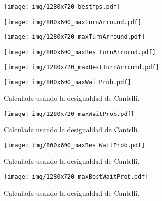 \begin{figure}[h]

	\texttt{[image: img/1280x720\_bestfps.pdf]}
	\caption{}

\end{figure}

\begin{figure}[h]

	\texttt{[image: img/800x600\_maxTurnArround.pdf]}
	\caption{}

\end{figure}

\begin{figure}[h]

	\texttt{[image: img/1280x720\_maxTurnArround.pdf]}
	\caption{}

\end{figure}

\begin{figure}[h]

	\texttt{[image: img/800x600\_maxBestTurnArround.pdf]}
	\caption{}

\end{figure}

\begin{figure}[h]

	\texttt{[image: img/1280x720\_maxBestTurnArround.pdf]}
	\caption{}

\end{figure}

\begin{figure}[h]

	\texttt{[image: img/800x600\_maxWaitProb.pdf]}
	\caption{Calculado usando la desigualdad de Cantelli.}

\end{figure}

\begin{figure}[h]

	\texttt{[image: img/1280x720\_maxWaitProb.pdf]}
	\caption{Calculado usando la desigualdad de Cantelli.}

\end{figure}

\begin{figure}[h]

	\texttt{[image: img/800x600\_maxBestWaitProb.pdf]}
	\caption{Calculado usando la desigualdad de Cantelli.}

\end{figure}

\begin{figure}[h]

	\texttt{[image: img/1280x720\_maxBestWaitProb.pdf]}
	\caption{Calculado usando la desigualdad de Cantelli.}

\end{figure}
